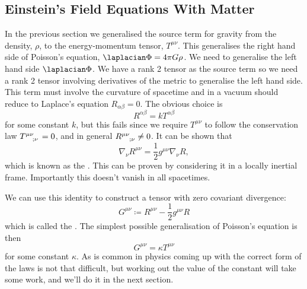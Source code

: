 \documentclass[fleqn]{NotesClass}
\newcommand*{\covariantDerivative}[1]{\nabla_{\!#1}}
\begin{document}
    \subsection{Einstein's Field Equations With Matter}
    In the previous section we generalised the source term for gravity from the density, \(\rho\), to the energy-momentum tensor, \(T^{\mu\nu}\).
    This generalises the right hand side of Poisson's equation, \(\laplacian \Phi = 4\pi G\rho\).
    We need to generalise the left hand side \(\laplacian\Phi\).
    We have a rank 2 tensor as the source term so we need a rank 2 tensor involving derivatives of the metric to generalise the left hand side.
    This term must involve the curvature of spacetime and in a vacuum should reduce to Laplace's equation \(R_{\alpha\beta} = 0\).
    The obvious choice is 
    \begin{equation}
        R^{\alpha\beta} = k T^{\alpha\beta}
    \end{equation}
    for some constant \(k\), but this fails since we require \(T^{\mu\nu}\) to follow the conservation law \(\tensor{T}{^{\mu\nu}_{;\nu}} = 0\), and in general \(\tensor{R}{^{\mu\nu}_{;\nu}} \ne 0\).
    It can be shown that
    \begin{equation}
        \covariantDerivative{\nu} R^{\mu\nu} = \frac{1}{2} g^{\mu\nu}\covariantDerivative{\nu} R,
    \end{equation}
    which is known as the .  %
    This can be proven by considering it in a locally inertial frame.
    Importantly this doesn't vanish in all spacetimes.
    
    We can use this identity to construct a tensor with zero covariant divergence:
    \begin{equation}
        G^{\mu\nu} \coloneqq R^{\mu\nu} - \frac{1}{2}g^{\mu\nu} R
    \end{equation}
    which is called the .
    The simplest possible generalisation of Poisson's equation is then
    \begin{equation}
        G^{\mu\nu} = \kappa T^{\mu\nu}
    \end{equation}
    for some constant \(\kappa\).
    As is common in physics coming up with the correct form of the laws is not that difficult, but working out the value of the constant will take some work, and we'll do it in the next section.
    
\end{document}
